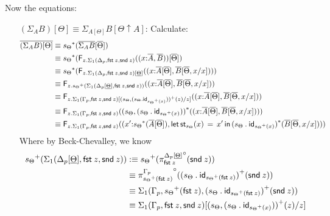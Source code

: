 \documentclass[10pt]{article}
\theoremstyle{definition}
\newcommand\dsd[1]{\ensuremath{\mathsf{#1}}}
\newcommand\F[2]{\ensuremath{\mathsf{F}_{#1}(#2)}}
\newcommand\St[2]{\ensuremath{{#1}^*(#2)}}
\newcommand\StI[2]{\ensuremath{\mathsf{st}_{#1}(#2)}}
\newcommand\StE[4]{\ensuremath{\mathsf{let} \, \StI{#1}{#3} \, = \, {#2} \, \mathsf{in} \, #4}}
\newcommand\TrPlus[2]{\ensuremath{{#1}^+(#2)}}
\newcommand\TrCirc[2]{\ensuremath{{#1}^\circ(#2)}}
\newcommand{\id}{\mathsf{id}}
\newcommand{\app}[2]{\ensuremath{#1 \: #2}}
\newcommand{\fst}[1]{\app{\dsd{fst}}{#1}}
\newcommand{\snd}[1]{\app{\dsd{snd}}{#1}}
\newcommand{\telety}[3]{\ensuremath{(#1{:}#2,#3)}}
\newcommand\bdot[0]{\mathbin{.}}
\begin{document}
Now the equations:
\begin{enumerate}[style = multiline, labelwidth = 80pt]
\item[{$(\Sigma_A B)[\Theta] \equiv \Sigma_{A[\Theta]} B[\Theta \uparrow A]$}:] Calculate:
\begin{align*}
\upstairs{(\Sigma_A B)[\Theta]}
&\equiv \St{s_\Theta}{\upstairs{\Sigma_A B}[\upstairs{\Theta}]} \\
&\equiv \St{s_\Theta}{\F{z.\Sigma_1(\asdep{\Delta}, \fst z, \snd z)}{\telety{x}{\upstairs{A}}{\upstairs{B}}}[\upstairs{\Theta}]} \\
&\equiv \St{s_\Theta}{\F{z.\Sigma_1(\asdep{\Delta}, \fst z, \snd z)[\downstairs{\Theta}]}{\telety{x}{\upstairs{A}[\upstairs{\Theta}]}{\upstairs{B}[\upstairs{\Theta}, x/x]}}} \\
&\equiv \F{z.\TrPlus{s_\Theta}{\Sigma_1(\asdep{\Delta}[\downstairs{\Theta}], \fst z, \snd z)}}{\telety{x}{\upstairs{A}[\upstairs{\Theta}]}{\upstairs{B}[\upstairs{\Theta}, x/x]}} \\
&\equiv \F{z.\Sigma_1(\asdep{\Gamma},\fst z,\snd z)[\TrPlus{(s_\Theta, (s_\Theta \bdot \id_{\TrPlus{s_\Theta}{x}}))}{z}/z]}{\telety{x}{\upstairs{A}[\upstairs{\Theta}]}{\upstairs{B}[\upstairs{\Theta}, x/x]}} \\
&\equiv \F{z.\Sigma_1(\asdep{\Gamma},\fst z,\snd z)}{\St{(s_\Theta, (s_\Theta \bdot \id_{\TrPlus{s_\Theta}{x}}))}{\telety{x}{\upstairs{A}[\upstairs{\Theta}]}{\upstairs{B}[\upstairs{\Theta}, x/x]}}} \\
&\equiv \F{z.\Sigma_1(\asdep{\Gamma},\fst z,\snd z)}{\telety{x'}{\St{s_\Theta}{\upstairs{A}[\upstairs{\Theta}]}}{\StE{s_\Theta}{x'}{x}{\St{(s_\Theta \bdot \id_{\TrPlus{s_\Theta}{x}})}{\upstairs{B}[\upstairs{\Theta}, x/x]}}}}
\end{align*}
Where by Beck-Chevalley, we know
\begin{align*}
\TrPlus{s_\Theta}{\Sigma_1(\asdep{\Delta}[\downstairs{\Theta}], \fst z, \snd z)}
&:\equiv \TrPlus{s_\Theta}{\TrCirc{\pi^{\asdep{\Delta}[\downstairs{\Theta}]}_{\fst z}}{\snd z}} \\
&\equiv \TrCirc{\pi^{\asdep{\Gamma}}_{\TrPlus{s_\Theta}{\fst z}}}{\TrPlus{(s_\Theta \bdot \id_{\TrPlus{s_\Theta}{\fst z}})}{\snd z}} \\
&\equiv \Sigma_1(\asdep{\Gamma},\TrPlus{s_\Theta}{\fst z},\TrPlus{(s_\Theta \bdot \id_{\TrPlus{s_\Theta}{\fst z}})}{\snd z}) \\
&\equiv \Sigma_1(\asdep{\Gamma},\fst z,\snd z)[\TrPlus{(s_\Theta, (s_\Theta \bdot \id_{\TrPlus{s_\Theta}{x}}))}{z}/z]
\end{align*}

\end{enumerate}
\end{document}
